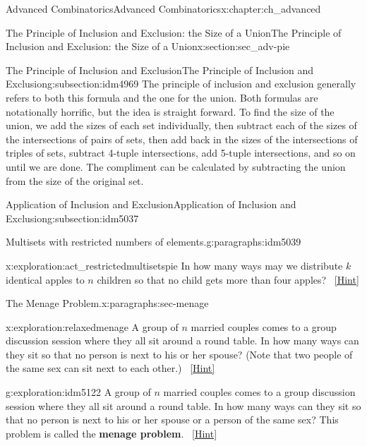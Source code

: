 \documentclass[oneside,10pt,]{book}
\newcommand{\terminology}[1]{\textbf{#1}}
\numberwithin{equation}{chapter}
\begin{document}
\begin{chapterptx}{Advanced Combinatorics}{}{Advanced Combinatorics}{}{}{x:chapter:ch_advanced}
\begin{sectionptx}{The Principle of Inclusion and Exclusion: the Size of a Union}{}{The Principle of Inclusion and Exclusion: the Size of a Union}{}{}{x:section:sec_adv-pie}
\begin{subsectionptx}{The Principle of Inclusion and Exclusion}{}{The Principle of Inclusion and Exclusion}{}{}{g:subsection:idm4969}
The principle of inclusion and exclusion generally refers to both this formula and the one for the union.  Both formulas are notationally horrific, but the idea is straight forward.  To find the size of the union, we add the sizes of each set individually, then subtract each of the sizes of the intersections of pairs of sets, then add back in the sizes of the intersections of triples of sets, subtract 4-tuple intersections, add 5-tuple intersections, and so on until we are done.  The compliment can be calculated by subtracting the union from the size of the original set.%
\end{subsectionptx}
%
%
\typeout{************************************************}
\typeout{************************************************}
%
\begin{subsectionptx}{Application of Inclusion and Exclusion}{}{Application of Inclusion and Exclusion}{}{}{g:subsection:idm5037}
\begin{paragraphs}{Multisets with restricted numbers of elements.}{g:paragraphs:idm5039}%
\begin{exploration}{}{x:exploration:act_restrictedmultisetspie}%
In how many ways may we distribute \(k\) identical apples to \(n\) children so that no child gets more than four apples?%
\qquad~\hfill{\tiny\hyperlink{g:hint:idm5046-back}{[Hint]}}\end{exploration}
\end{paragraphs}%
\begin{paragraphs}{The Menage Problem.}{x:paragraphs:sec-menage}%
\begin{exploration}{}{x:exploration:relaxedmenage}%
A group of \(n\) married couples comes to a group discussion session where they all sit around a round table. In how many ways can they sit so that no person is next to his or her spouse? (Note that two people of the same sex can sit next to each other.)%
\qquad~\hfill{\tiny\hyperlink{g:hint:idm5090-back}{[Hint]}}\end{exploration}
\begin{exploration}{}{g:exploration:idm5122}%
A group of \(n\) married couples comes to a group discussion session where they all sit around a round table. In how many ways can they sit so that no person is next to his or her spouse or a person of the same sex? This problem is called the \terminology{menage problem}.%
\qquad~\hfill{\tiny\hyperlink{g:hint:idm5129-back}{[Hint]}}\end{exploration}

\end{paragraphs}
\end{subsectionptx}
\end{sectionptx}
\end{chapterptx}
\end{document}
